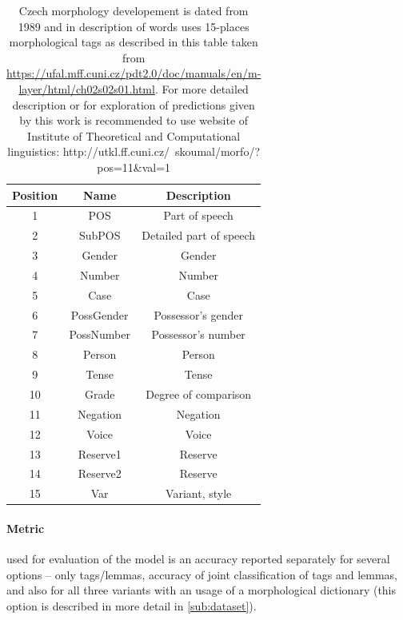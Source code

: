 \begin{table}[!ht]
\centering
\begin{tabular}{ |c|c|c| } 

 \hline
 Position & Name & Description \\ 
 \hline \hline
 1 & POS & Part of speech \\ \hline
 2 & SubPOS & Detailed part of speech \\ \hline
  3 & Gender & Gender \\ \hline
4 & Number & Number \\\hline
  5 & Case & Case \\ \hline
 6 & PossGender & Possessor's gender \\\hline
  7 & PossNumber & Possessor's number \\ \hline
8 & Person & Person \\\hline
  9 & Tense & Tense \\ \hline
 10 & Grade & Degree of comparison\\\hline
  11 & Negation & Negation \\ \hline
 12 & Voice & Voice \\\hline
 13 & Reserve1 & Reserve \\ \hline
14 & Reserve2 & Reserve \\\hline
  15 & Var & Variant, style \\ 
 \hline

\end{tabular}
\caption{Czech morphology developement is dated from 1989 \citep{Hajic2004} 
and in description of words uses 15-places morphological tags as described in this table taken from \url{https://ufal.mff.cuni.cz/pdt2.0/doc/manuals/en/m-layer/html/ch02s02s01.html}. For more detailed  description or for exploration of predictions given by this work is recommended to use website of Institute of Theoretical and Computational linguistics: http://utkl.ff.cuni.cz/~skoumal/morfo/?pos=11\&val=1}
\label{Tab:tagset}
\end{table}



\paragraph{Metric} used for evaluation of the model is an accuracy reported separately for several options -- only tags/lemmas, accuracy of joint classification of tags and lemmas, and  also for all three variants with an usage of a morphological dictionary (this option is described in more detail in \ref{sub:dataset}).

